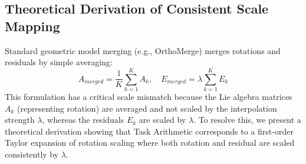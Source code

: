 \documentclass{article}
\theoremstyle{plain}
\theoremstyle{definition}
\theoremstyle{remark}
\begin{document}
\subsection{Theoretical Derivation of Consistent Scale Mapping}
Standard geometric model merging (e.g., OrthoMerge) merges rotations and residuals by simple averaging:
\begin{equation}
    A_{merged} = \frac{1}{K} \sum_{k=1}^K A_k, \quad E_{merged} = \lambda \sum_{k=1}^K E_k
\end{equation}
This formulation has a critical scale mismatch because the Lie algebra matrices $A_k$ (representing rotation) are averaged and not scaled by the interpolation strength $\lambda$, whereas the residuals $E_k$ are scaled by $\lambda$. To resolve this, we present a theoretical derivation showing that Task Arithmetic corresponds to a first-order Taylor expansion of rotation scaling where both rotation and residual are scaled consistently by $\lambda$.
\end{document}
